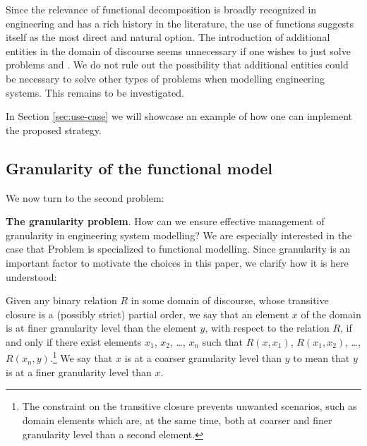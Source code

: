 \documentclass[
]{ceurart}
\begin{document}
Since the relevance of functional decomposition is broadly recognized in engineering and has a rich history in the literature, the use of functions suggests itself as the most direct and natural option.
The introduction of additional entities in the domain of discourse
seems unnecessary if one wishes to just solve problems  and . We do not rule out the possibility that additional entities could be necessary to solve other types of problems when modelling engineering systems. This remains to be investigated.

In Section \ref{sec:use-case} we will showcase an example of how one can implement the proposed strategy.  

\subsection{Granularity of the functional model}
We now turn to the second problem:
\bflist
  \item[\mypb{granularity-problem}] \textbf{The granularity problem}. How can we ensure effective management of granularity in engineering system modelling?
\eflist
We are especially interested in the case that Problem  is specialized to functional modelling.
Since granularity is an important factor to motivate the choices in this paper, we clarify how it is here understood:
\bflist
\item[\mydf{granularity}]
    Given any binary relation $R$ in some domain of discourse, whose transitive closure is a (possibly strict) partial order, we say that an element $x$ of the domain is at finer granularity level than the element $y$, with respect to the relation $R$, if and only if there exist elements $x_1$, $x_2$, \dots, $x_n$ such that $R(x,x_1)$, $R(x_1,x_2)$, \dots, $R(x_n,y)$.\footnote{The constraint on the transitive closure prevents unwanted scenarios, such as domain elements which are, at the same time, both at coarser and finer granularity level than a second element.} 
    We say that $x$ is at a coarser granularity level than $y$ to mean that $y$ is at a finer granularity level than $x$.
    
\end{document}
